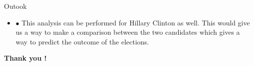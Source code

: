 \documentclass{beamer}
\begin{document}
\begin{frame}{Outook}

\begin{itemize}

\item {} {$\bullet$ This analysis can be performed for Hillary Clinton as well. This would give us a way to make a comparison between the two candidates which gives a way to predict the outcome of the elections.}


\end{itemize}

\end{frame}


\begin{frame}{}

\begin{center}

{\bf Thank you !}

\end{center}

\end{frame}
\end{document}
